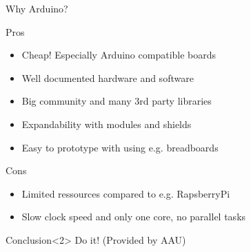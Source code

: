 \begin{frame}{Why Arduino?}
	\begin{block}{Pros}
		\begin{itemize}
			\item Cheap! Especially Arduino compatible boards
			\item Well documented hardware and software
			\item Big community and many \textcolor{ReneOrange}{3rd party libraries}
			\item Expandability with \textcolor{ReneOrange}{modules} and shields
			\item Easy to prototype with using e.g. breadboards
		\end{itemize}		
	\end{block}	
	\begin{block}{Cons}
		\begin{itemize}
			\item Limited ressources compared to e.g. RapsberryPi
			\item Slow clock speed and only one core, no parallel tasks
		\end{itemize}	
	\end{block}
	\begin{exampleblock}{Conclusion}<2>
		Do it! (Provided by AAU)
	\end{exampleblock}		
\end{frame}